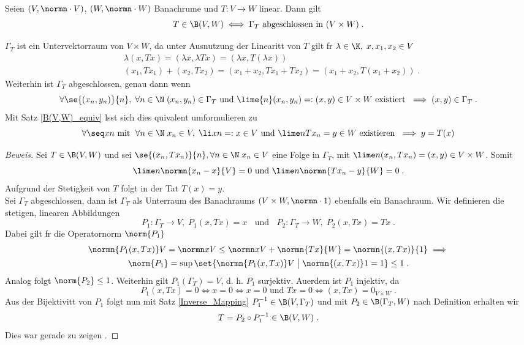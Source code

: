 \begin{theorem}
\begin{theorem}
Seien \((V,\normn\cdot V)\), \((W,\normn\cdot W)\) Banachr\as ume und \(T:V\to W\) linear. Dann gilt
\[T \in \B(V,W) \iff \Gamma_T \text{ abgeschlossen in }(V\times W)\;.\]
\label{closed_graph}
\end{theorem}
\begin{rem}
	\(\Gamma_T\) ist ein Untervektorraum von \(V\times W\), da unter Ausnutzung der Linearit\as t von $T$ gilt f\us r \(\lambda \in \K,\; x, x_1, x_2 \in V\)
	\begin{align*}
		& \lambda (x, Tx) = (\lambda x, \lambda Tx) = (\lambda x, T(\lambda x)) \\
		& (x_1, Tx_1) + (x_2, Tx_2) = (x_1 + x_2, Tx_1 + Tx_2) = (x_1 + x_2, T(x_1 + x_2))\;.
	\end{align*}
	Weiterhin ist \(\Gamma_T\) abgeschlossen, genau dann wenn 
	\[\forall \se{(x_n, y_n)}{n},\;\forall n\in\N \;(x_n, y_n) \in \Gamma_T \text{ und } \lime{n} (x_n, y_n) =:(x,y) \in V\times W \text{ existiert } \implies (x,y) \in \Gamma_T\;.\]
	Mit Satz \ref{B(V,W)_equiv} l\as sst sich dies \as quivalent umformulieren zu
	\[\forall \seq xn \text{ mit }\;\forall n\in \N\; x_n \in V,\;\li xn =: x \in V  \text{ und } \lime n {Tx_n} = y \in W\text{ existieren } \implies y = T(x)\]
\end{rem}
\begin{proof}[Beweis]
	\happybegin
	\forw Sei \(T\in \B(V,W)\) und sei \(\se{(x_n, Tx_n)}{n}, \forall n\in \N\; x_n \in V\) eine Folge in \(\Gamma_T\), mit \(\lime n (x_n, Tx_n) = (x,y) \in V\times W\).  Somit 
	\[\lime n\normn{x_n - x}{V}  = 0 \text{ und } \lime n \normn{Tx_n - y}{W} = 0\;.\]
	Aufgrund der Stetigkeit von $T$ folgt in der Tat \(T(x) = y\).\\
	\backw Sei \(\Gamma_T\) abgeschlossen, dann ist \(\Gamma_T\) als Unterraum des Banachraums \((V\times W,\normn\cdot 1)\) ebenfalls ein Banachraum. Wir definieren die stetigen, linearen Abbildungen
	\[P_1: \Gamma_T \to V,\; P_1(x,Tx) = x \;\;\text{ und }\;\; P_2: \Gamma_T\to W,\; P_2(x,Tx) = Tx\;.\]
	Dabei gilt f\us r die Operatornorm $\norm{P_1}$
	\begin{multline*}
	\normn{P_1(x,Tx)}V = \normn xV \leq \normn xV + \normn{Tx}{W} = \normn{(x,Tx)}{1} \implies \\ \norm{P_1} = \sup \set{ \normn{P_1(x,Tx)}V\;\big\vert\;\normn{(x,Tx)}1 = 1}\leq 1\;.
	\end{multline*}
	Analog folgt \(\norm{P_2} \leq 1\). Weiterhin gilt \(P_1(\Gamma_T) = V\), d. h. $P_1$ surjektiv. Au\s erdem ist $P_1$ injektiv, da
	\[P_1(x,Tx) = 0 \iff x = 0 \iff x = 0 \text{ und } Tx = 0 \iff (x,Tx) = 0_{V\times W}\;.\]
	Aus der Bijektivit\as t von $P_1$ folgt nun mit Satz \ref{Inverse_Mapping} \(P_1^{-1} \in \B(V,\Gamma_T)\) und mit \(P_2 \in \B(\Gamma_T, W)\) nach Definition erhalten wir 
	\[T = P_2 \circ P_1^{-1} \in \B(V,W)\;.\]
	Dies war  gerade zu zeigen \happyend.
\end{proof}


\end{theorem}
